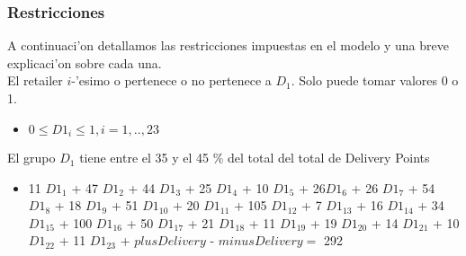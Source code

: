 \subsubsection{Restricciones}
A continuaci'on detallamos las restricciones impuestas en el modelo y una breve explicaci'on sobre cada una. \\
El retailer $i$-'esimo o pertenece o no pertenece a $D_1$. Solo puede tomar valores 0 o 1. 
\begin{itemize}
\item $0 \leq {D1}_i \leq 1 ,  i = 1,..,23 $ \\
\end{itemize}
El grupo $D_1$ tiene entre el 35 y el 45 \% del total del total de Delivery Points 
\begin{itemize}
\item 11 ${D1}_1$ + 47 ${D1}_2$ + 44 ${D1}_3$ + 25 ${D1}_4$ + 10 ${D1}_5$ + 26${D1}_6$ + 26 ${D1}_7$ + 54 ${D1}_8$ + 18 ${D1}_9$ + 51 ${D1}_{10}$ + 20 ${D1}_{11}$ + 105 ${D1}_{12}$ + 7 ${D1}_{13}$ + 16 ${D1}_{14}$ + 34 ${D1}_{15}$ + 100 ${D1}_{16}$ + 50 ${D1}_{17}$ + 21 ${D1}_{18}$ + 11 ${D1}_{19}$ + 19 ${D1}_{20}$ + 14 ${D1}_{21}$ + 10 ${D1}_{22}$ + 11 ${D1}_{23}$ + $plusDelivery$ - $minusDelivery = $ 292
\end{itemize}
